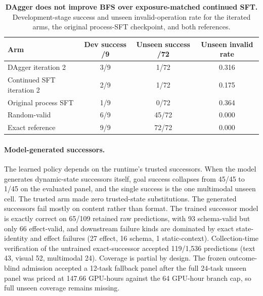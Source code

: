 \begin{table}[t]
\caption{\textbf{DAgger does not improve BFS over exposure-matched continued SFT.} Development-stage success and unseen invalid-operation rate for the iterated arms, the original process-SFT checkpoint, and both references.}
\label{tab:results-dagger}
\centering\footnotesize
\begin{tabular}{lccc}
\toprule[0.4mm]
\rowcolor{mygray}\textbf{Arm} & \textbf{Dev success /9} & \textbf{Unseen success /72} & \textbf{Unseen invalid rate} \\
\midrule
DAgger iteration 2 & 3/9 & 1/72 & 0.316 \\
Continued SFT iteration 2 & 2/9 & 1/72 & 0.175 \\
Original process SFT & 1/9 & 0/72 & 0.364 \\
\midrule
Random-valid & 6/9 & 45/72 & 0.000 \\
Exact reference & 9/9 & 72/72 & 0.000 \\
\bottomrule
\end{tabular}
\end{table}

\paragraph{Model-generated successors.} The learned policy depends on the runtime's trusted successors. When the model generates dynamic-state successors itself, goal success collapses from 45/45 to 1/45 on the evaluated panel, and the single success is the one multimodal unseen cell. The trusted arm made zero trusted-state substitutions. The generated successors fail mostly on content rather than format. The trained successor model is exactly correct on 65/109 retained raw predictions, with 93 schema-valid but only 66 effect-valid, and downstream failure kinds are dominated by exact state-identity and effect failures (27 effect, 16 schema, 1 static-context). Collection-time verification of the untrained exact-successor accepted 119/1,536 predictions (text 43, visual 52, multimodal 24). Coverage is partial by design. The frozen outcome-blind admission accepted a 12-task fallback panel after the full 24-task unseen panel was priced at 147.66 GPU-hours against the 64 GPU-hour branch cap, so full unseen coverage remains missing.


